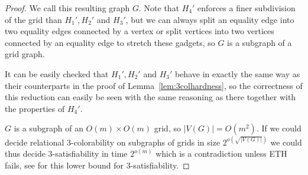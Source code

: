 \documentclass[10pt,a4paper]{article}
\numberwithin{equation}{section}
\theoremstyle{definition}
\begin{document}
\begin{proof}
    We call this resulting graph $G$.
    Note that $H_4'$ enforces a finer subdivision of the grid than $H_1', H_2'$ and $H_3'$, but we can always split an equality edge into two equality edges connected by a vertex or split vertices into two vertices connected by an equality edge to stretch these gadgets, so $G$ is a subgraph of a grid graph.

    It can be easily checked that $H_1', H_2'$ and $H_3'$ behave in exactly the same way as their counterparts in the proof of Lemma~\ref{lem:3colhardness}, so the correctness of this reduction can easily be seen with the same reasoning as there together with the properties of $H_4'$.

    $G$ is a subgraph of an $O(m) \times O(m)$ grid, so $|V(G)| = O(m^2)$.
    If we could decide relational $3$-colorability on subgraphs of grids in size $2^{o\left(\sqrt{|V(G)|}\right)}$ we could thus decide $3$-satisfiability in time $2^{o\left(m\right)}$ which is a contradiction unless ETH fails, see \cite{DBLP:journals/jcss/ImpagliazzoPZ01} for this lower bound for $3$-satisfiability.
\end{proof}
\end{document}
